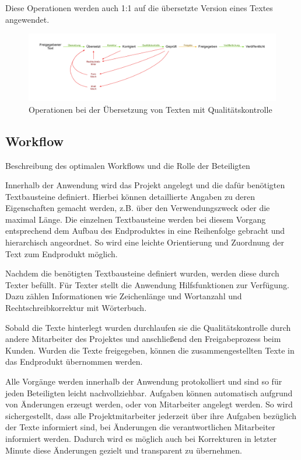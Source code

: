 Diese Operationen werden auch 1:1 auf die übersetzte Version eines Textes angewendet.

\begin{figure}[htb]
\begin{center}
\includegraphics[width=\textwidth]{media/chart-5.pdf}
\end{center}
\caption{Operationen bei der Übersetzung von Texten mit Qualitätskontrolle}
\label{chart:5}
\end{figure}


\subsection{Workflow}

Beschreibung des optimalen Workflows und die Rolle der Beteiligten

Innerhalb der Anwendung wird das Projekt angelegt und die dafür benötigten Textbausteine definiert. Hierbei können detaillierte Angaben zu deren Eigenschaften gemacht werden, z.B. über den Verwendungszweck oder die maximal Länge. Die einzelnen Textbausteine werden bei diesem Vorgang entsprechend dem Aufbau des Endproduktes in eine Reihenfolge gebracht und hierarchisch angeordnet. So wird eine leichte Orientierung und Zuordnung der Text zum Endprodukt möglich. 

Nachdem die benötigten Textbausteine definiert wurden, werden diese durch Texter befüllt. Für Texter stellt die Anwendung Hilfsfunktionen zur Verfügung. Dazu zählen Informationen wie Zeichenlänge und Wortanzahl und Rechtschreibkorrektur mit Wörterbuch.

Sobald die Texte hinterlegt wurden durchlaufen sie die Qualitätskontrolle durch andere Mitarbeiter des Projektes und anschließend den Freigabeprozess beim Kunden. Wurden die Texte freigegeben, können die zusammengestellten Texte in das Endprodukt übernommen werden. 

Alle Vorgänge werden innerhalb der Anwendung protokolliert und sind so für jeden Beteiligten leicht nachvollziehbar. Aufgaben können automatisch aufgrund von Änderungen erzeugt werden, oder von Mitarbeiter angelegt werden. So wird sichergestellt, dass alle Projektmitarbeiter jederzeit über ihre Aufgaben bezüglich der Texte informiert sind, bei Änderungen die verantwortlichen Mitarbeiter informiert werden. Dadurch wird es möglich auch bei Korrekturen in letzter Minute diese Änderungen gezielt und transparent zu übernehmen.

